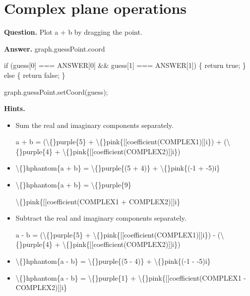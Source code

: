 \documentclass{article}
\begin{document}
\section*{Complex plane operations}
\textbf{Question.} Plot a + b by dragging the point.

\textbf{Answer.} graph.guessPoint.coord
                
                    if (guess[0] === ANSWER[0] \&\& guess[1] === ANSWER[1]) \{
                        return true;
                    \} else \{
                        return false;
                    \}
                
                
                    graph.guessPoint.setCoord(guess);

\textbf{Hints.}
\begin{itemize}
  \item Sum the real and imaginary components separately.
                            
                                a + b =
                                (\textbackslash\{\}purple\{5\} + \textbackslash\{\}pink\{[[coefficient(COMPLEX1)]]i\}) +
                                (\textbackslash\{\}purple\{4\} + \textbackslash\{\}pink\{[[coefficient(COMPLEX2)]]i\})
  \item \textbackslash\{\}hphantom\{a + b\} =
                                \textbackslash\{\}purple\{(5 + 4)\} +
                                \textbackslash\{\}pink\{(-1 + -5)i\}
  \item \textbackslash\{\}hphantom\{a + b\} =
                                \textbackslash\{\}purple\{9\}
                                
                                \textbackslash\{\}pink\{[[coefficient(COMPLEX1 + COMPLEX2)]]i\}
  \item Subtract the real and imaginary components separately.
                            
                                a - b =
                                (\textbackslash\{\}purple\{5\} + \textbackslash\{\}pink\{[[coefficient(COMPLEX1)]]i\}) -
                                (\textbackslash\{\}purple\{4\} + \textbackslash\{\}pink\{[[coefficient(COMPLEX2)]]i\})
  \item \textbackslash\{\}hphantom\{a - b\} =
                                \textbackslash\{\}purple\{(5 - 4)\} +
                                \textbackslash\{\}pink\{(-1 - -5)i\}
  \item \textbackslash\{\}hphantom\{a - b\} =
                                \textbackslash\{\}purple\{1\}
                                +
                                \textbackslash\{\}pink\{[[coefficient(COMPLEX1 - COMPLEX2)]]i\}
\end{itemize}
\end{document}
